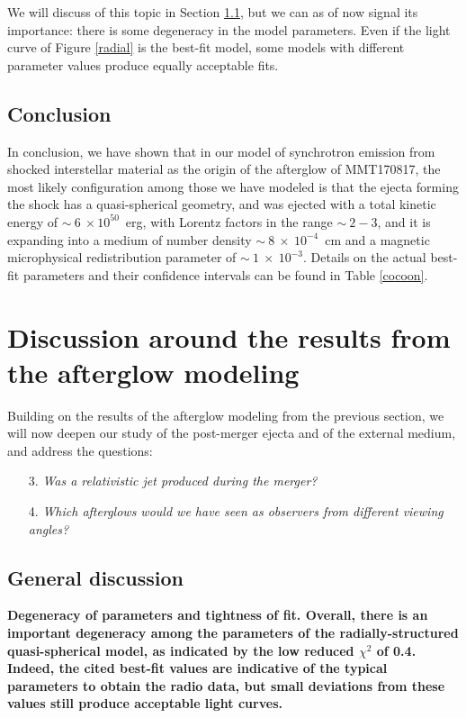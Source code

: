 We will discuss of this topic in Section \ref{qwe}, but we can as of now signal its importance: there is some degeneracy in the model parameters. Even if the light curve of Figure \ref{radial} is the best-fit model, some models with different parameter values produce equally acceptable fits.


\subsection{Conclusion}

In conclusion, we have shown that in our model of synchrotron emission from shocked interstellar material as the origin of the afterglow of MMT170817, the most likely configuration among those we have modeled is that the ejecta forming the shock has a quasi-spherical geometry, and was ejected with a total kinetic energy of $\sim~6~\times 10^{50}$~erg, with Lorentz factors in the range $\sim~2-3$, and it is expanding into a medium of number density $\sim~8~\times~10^{-4}$~cm and a magnetic microphysical redistribution parameter of $\sim~1~\times~10^{-3}$. Details on the actual best-fit parameters and their confidence intervals can be found in Table \ref{cocoon}.

\section{Discussion around the results from the afterglow modeling}
Building on the results of the afterglow modeling from the previous section, we will now deepen our study of the post-merger ejecta and of the external medium, and address the questions:

\begin{itemize}
    \item[3.] \it{Was a relativistic jet produced during the merger?}
    \item[4.] \it{Which afterglows would we have seen as observers from different viewing angles?}
\end{itemize}

\subsection{General discussion}
\label{qwe}

\bf{Degeneracy of parameters and tightness of fit. }Overall, there is an important degeneracy among the parameters of the radially-structured quasi-spherical model, as indicated by the low reduced $\chi^2$ of 0.4. Indeed, the cited best-fit values are indicative of the typical parameters to obtain the radio data, but small deviations from these values still produce acceptable light curves.

